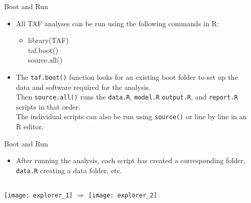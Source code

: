 \documentclass[aspectratio=169]{beamer}
\begin{document}
\begin{frame}{Boot and Run}\small
  \begin{itemize}
    \item[] All TAF analyses can be run using the following commands in
    R:\\[2ex]
    \begin{itemize}\tt\item[]
      {\blue library}(TAF)\\
      {\blue taf.boot}()\\
      {\blue source.all}()\\[3ex]
    \end{itemize}
    \item[] The {\tt\blue taf.boot()} function looks for an existing boot folder
    to set up the\\ data and software required for the analysis.\\[3ex]
    Then {\tt\blue source.all()} runs the {\tt data.R}, {\tt model.R}
    {\tt output.R}, and {\tt report.R}\\ scripts in that order.\\[3ex]
    The individual scripts can also be run using {\tt\blue source()} or line by
    line in an\\
    R editor.\\[4ex]
  \end{itemize}
\end{frame}


\begin{frame}{Boot and Run}\small
  \begin{itemize}
    \item[] After running the analysis, each script has created a corresponding
    folder,\\[0.2ex]
    {\tt data.R} creating a data folder, etc.\\[4ex]
  \end{itemize}
  \centering
  \begin{columns}[T]
    \texttt{[image: explorer\_1]}
    \vspace{7ex}
    \centering\darkgray\large$\Rightarrow$
    \texttt{[image: explorer\_2]}
  \end{columns}
\end{frame}
\end{document}
